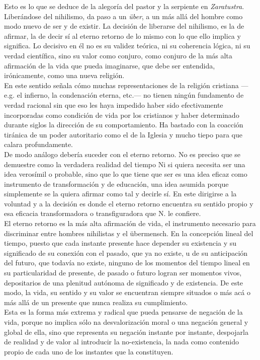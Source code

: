 \documentclass[a4paper, 10pt, twocolumn, spanish]{article}
\begin{document}
Esto es lo que se deduce de la alegoría del pastor y la serpiente en
\emph{Zaratustra}. Liberándose del nihilismo, da paso a un \emph{über}, a un más
allá del hombre como modo nuevo de ser y de existir. La decisión de
liberarse del nihilismo, es la de afirmar, la de decir sí al eterno
retorno de lo mismo con lo que ello implica y significa. Lo decisivo
en él no es su validez teórica, ni su coherencia lógica, ni su verdad
científica, sino su valor como conjuro, como conjuro de la más alta
afirmación de la vida que pueda imaginarse, que debe ser entendida,
irónicamente, como una nueva religión.\\[0pt]

En este sentido señala cómo muchas representaciones de la religión
cristiana —e.g. el infierno, la condenación eterna, etc.— no tienen
ningún fundamento de verdad racional sin que eso les haya impedido
haber sido efectivamente incorporadas como condición de vida por los
cristianos y haber determinado durante siglos la dirección de su
comportamiento. Ha bastado con la coacción tiránica de un poder
autoritario como el de la Iglesia y mucho tiepo para que calara
profundamente.\\[0pt]

De modo análogo debería suceder con el eterno retorno. No es preciso
que se demuestre como la verdadera realidad del tiempo Ni si quiera
necesita ser una idea verosímil o probable, sino que lo que tiene que
ser es una idea eficaz como instrumento de transformación y de
educación, una idea asumida porque simplemente se la quiera afirmar
como tal y decirle sí. En este dirigirse a la voluntad y a la decisión
es donde el eterno retorno encuentra su sentido propio y esa eficacia
transformadora o transfiguradora que N. le confiere.\\[0pt]

El eterno retorno es la más alta afirmación de vida, el instrumento
necesario para discriminar entre hombres nihilistas y el
übermensch. En la concepción lineal del tiempo, puesto que cada
instante presente hace depender su existencia y su significado de su
conexión con el pasado, que ya no existe, u de su anticipación del
futuro, que todavía no existe, ninguno de los momentos del tiempo
lineal en su particularidad de presente, de pasado o futuro logran ser
momentos vivos, depositarios de una plenitud autónoma de significado y
de existencia. De este modo, la vida, su sentido y su valor se
encuentran siempre situados o más acá o más allá de un presente que
nunca realiza su cumplimiento.\\[0pt]
Esta es la forma más extrema y radical que pueda pensarse de negación
de la vida, porque no implica sólo na desvalorización moral o una
negación general y global de ella, sino que representa su negación
instante por instante, despojarla de realidad y de valor al introducir
la no-existencia, la nada como contenido propio de cada uno de los
instantes que la constituyen.\\[0pt]
\end{document}
